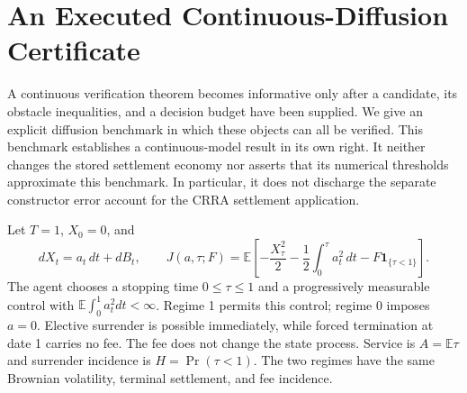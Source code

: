 \section{An Executed Continuous-Diffusion Certificate}
\label{sec:r19-continuous-benchmark}
A continuous verification theorem becomes informative only after a candidate, its obstacle inequalities, and a decision budget have been supplied. We give an explicit diffusion benchmark in which these objects can all be verified. This benchmark establishes a continuous-model result in its own right. It neither changes the stored settlement economy nor asserts that its numerical thresholds approximate this benchmark. In particular, it does not discharge the separate constructor error account for the CRRA settlement application.

Let $T=1$, $X_0=0$, and
\begin{equation}
 dX_t=a_t\,dt+dB_t,
 \qquad
 J(a,\tau;F)=\mathbb E\left[-\frac{X_\tau^2}{2}-\frac12\int_0^\tau a_t^2\,dt-F\mathbf1_{\{\tau<1\}}\right].
 \label{eq:r19-lq-economy}
\end{equation}
The agent chooses a stopping time $0\leq\tau\leq1$ and a progressively measurable control with $\mathbb E\int_0^1a_t^2dt<\infty$. Regime 1 permits this control; regime 0 imposes $a=0$. Elective surrender is possible immediately, while forced termination at date 1 carries no fee. The fee does not change the state process. Service is $A=\mathbb E\tau$ and surrender incidence is $H=\Pr(\tau<1)$. The two regimes have the same Brownian volatility, terminal settlement, and fee incidence.

